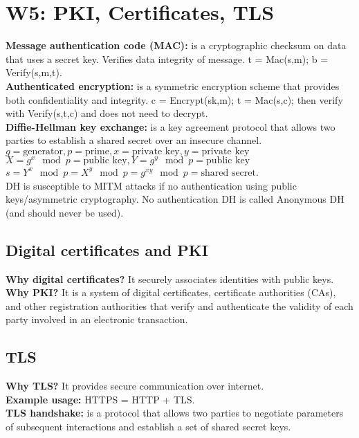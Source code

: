 \section{W5: PKI, Certificates, TLS}
\textbf{Message authentication code (MAC):} is a cryptographic checksum on data that uses a secret key. Verifies data integrity of message. t = Mac(s,m); b = Verify(s,m,t).\\
\textbf{Authenticated encryption:} is a symmetric encryption scheme that provides both confidentiality and integrity. c = Encrypt(sk,m); t = Mac(s,c); then verify with Verify(s,t,c) and does not need to decrypt.\\
\textbf{Diffie-Hellman key exchange:} is a key agreement protocol that allows two parties to establish a shared secret over an insecure channel.\\
$g = \text{generator}, p = \text{prime}, x = \text{private key}, y = \text{private key}$\\
$X = g^x \mod p = \text{public key}, Y = g^y \mod p = \text{public key}$\\
$s = Y^x \mod p = X^y \mod p = g^{xy} \mod p = \text{shared secret}$.\\
DH is susceptible to MITM attacks if no authentication using public keys/asymmetric cryptography. No authentication DH is called Anonymous DH (and should never be used).\\

\subsection{Digital certificates and PKI}
\textbf{Why digital certificates?} It securely associates identities with public keys.\\
\textbf{Why PKI?} It is a system of digital certificates, certificate authorities (CAs), and other registration authorities that verify and authenticate the validity of each party involved in an electronic transaction.\\

\subsection{TLS}
\textbf{Why TLS?} It provides secure communication over internet.\\
\textbf{Example usage:} HTTPS = HTTP + TLS.\\
\textbf{TLS handshake:} is a protocol that allows two parties to negotiate parameters of subsequent interactions and establish a set of shared secret keys.\\
